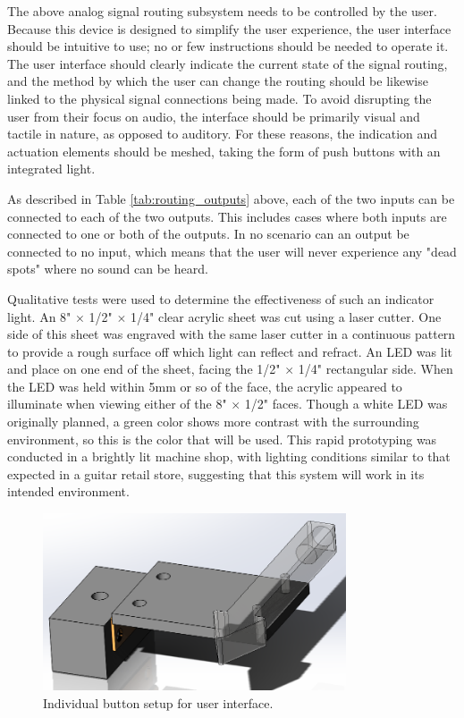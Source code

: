 \documentclass{article}
\begin{document}
	The above analog signal routing subsystem needs to be controlled by the user.  Because this device is designed to simplify the user experience, the user interface should be intuitive to use; no or few instructions should be needed to operate it.  The user interface should clearly indicate the current state of the signal routing, and the method by which the user can change the routing should be likewise linked to the physical signal connections being made.  To avoid disrupting the user from their focus on audio, the interface should be primarily visual and tactile in nature, as opposed to auditory.  For these reasons, the indication and actuation elements should be meshed, taking the form of push buttons with an integrated light.

	As described in Table \ref{tab:routing_outputs} above, each of the two inputs can be connected to each of the two outputs.  This includes cases where both inputs are connected to one or both of the outputs.  In no scenario can an output be connected to no input, which means that the user will never experience any "dead spots" where no sound can be heard.

	Qualitative tests were used to determine the effectiveness of such an indicator light.  An 8" $\times$ 1/2" $\times$ 1/4" clear acrylic sheet was cut using a laser cutter.  One side of this sheet was engraved with the same laser cutter in a continuous pattern to provide a rough surface off which light can reflect and refract.  An LED was lit and place on one end of the sheet, facing the 1/2" $\times$ 1/4" rectangular side.  When the LED was held within 5mm or so of the face, the acrylic appeared to illuminate when viewing either of the 8" $\times$ 1/2" faces.  Though a white LED was originally planned, a green color shows more contrast with the surrounding environment, so this is the color that will be used.  This rapid prototyping was conducted in a brightly lit machine shop, with lighting conditions similar to that expected in a guitar retail store, suggesting that this system will work in its intended environment.

	\begin{figure}
		\centering
		\includegraphics[width = 0.8\textwidth]{PR5Images/UIArrowCloseupCAD.png}
		\caption{Individual button setup for user interface.  }
		\label{fig:UIButtonCloseUp}
	\end{figure}
\end{document}
